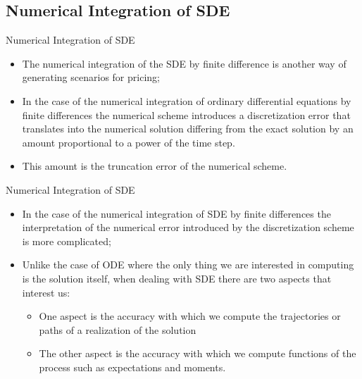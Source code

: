 \documentclass[11pt]{beamer}
\begin{document}
\subsection{Numerical Integration of SDE}
\begin{frame}{Numerical Integration of SDE	}
\begin{itemize}
\item The numerical integration of the SDE by finite difference is another way of generating scenarios for pricing;
\item In the case of the numerical integration of ordinary differential equations by finite differences the numerical scheme introduces a discretization  error that translates into the numerical solution differing from the exact solution by an amount proportional to a power of the time step. 
\item This amount is the truncation error of the numerical scheme. 
\end{itemize}
\end{frame}
\begin{frame}{Numerical Integration of SDE}
\begin{itemize}
\item In the case of the numerical integration of SDE by finite differences the interpretation of the numerical error introduced by the discretization scheme is more complicated;
\item Unlike the case of ODE where the only thing we are interested in computing is the solution itself, when dealing with SDE there are two aspects that interest us:
\begin{itemize}
\item One aspect is the accuracy with which we compute the trajectories or paths of a realization of the solution
\item The other aspect is the accuracy with which we compute functions of the process such as expectations and moments.
\end{itemize}

\end{itemize}
\end{frame}
\end{document}

